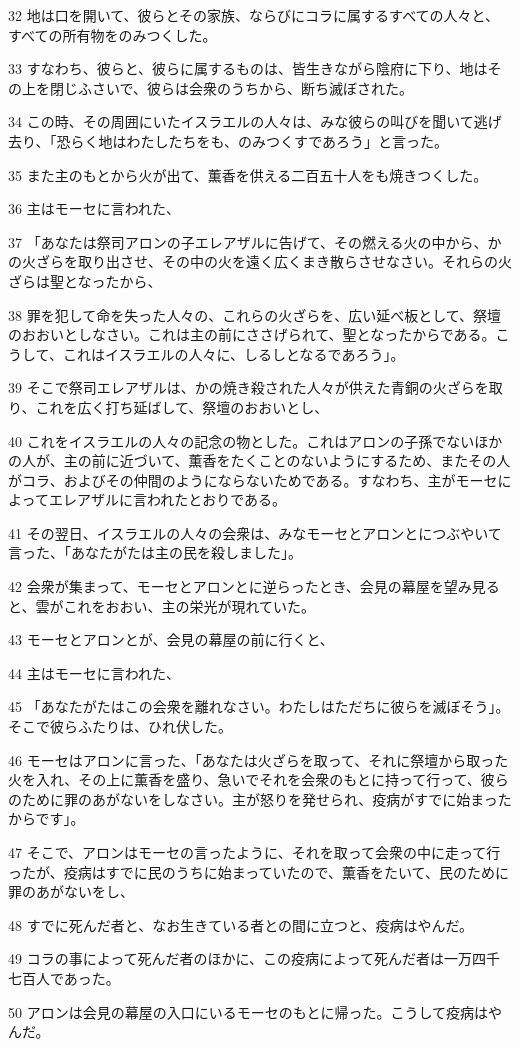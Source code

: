 \par 32 地は口を開いて、彼らとその家族、ならびにコラに属するすべての人々と、すべての所有物をのみつくした。
\par 33 すなわち、彼らと、彼らに属するものは、皆生きながら陰府に下り、地はその上を閉じふさいで、彼らは会衆のうちから、断ち滅ぼされた。
\par 34 この時、その周囲にいたイスラエルの人々は、みな彼らの叫びを聞いて逃げ去り、「恐らく地はわたしたちをも、のみつくすであろう」と言った。
\par 35 また主のもとから火が出て、薫香を供える二百五十人をも焼きつくした。
\par 36 主はモーセに言われた、
\par 37 「あなたは祭司アロンの子エレアザルに告げて、その燃える火の中から、かの火ざらを取り出させ、その中の火を遠く広くまき散らさせなさい。それらの火ざらは聖となったから、
\par 38 罪を犯して命を失った人々の、これらの火ざらを、広い延べ板として、祭壇のおおいとしなさい。これは主の前にささげられて、聖となったからである。こうして、これはイスラエルの人々に、しるしとなるであろう」。
\par 39 そこで祭司エレアザルは、かの焼き殺された人々が供えた青銅の火ざらを取り、これを広く打ち延ばして、祭壇のおおいとし、
\par 40 これをイスラエルの人々の記念の物とした。これはアロンの子孫でないほかの人が、主の前に近づいて、薫香をたくことのないようにするため、またその人がコラ、およびその仲間のようにならないためである。すなわち、主がモーセによってエレアザルに言われたとおりである。
\par 41 その翌日、イスラエルの人々の会衆は、みなモーセとアロンとにつぶやいて言った、「あなたがたは主の民を殺しました」。
\par 42 会衆が集まって、モーセとアロンとに逆らったとき、会見の幕屋を望み見ると、雲がこれをおおい、主の栄光が現れていた。
\par 43 モーセとアロンとが、会見の幕屋の前に行くと、
\par 44 主はモーセに言われた、
\par 45 「あなたがたはこの会衆を離れなさい。わたしはただちに彼らを滅ぼそう」。そこで彼らふたりは、ひれ伏した。
\par 46 モーセはアロンに言った、「あなたは火ざらを取って、それに祭壇から取った火を入れ、その上に薫香を盛り、急いでそれを会衆のもとに持って行って、彼らのために罪のあがないをしなさい。主が怒りを発せられ、疫病がすでに始まったからです」。
\par 47 そこで、アロンはモーセの言ったように、それを取って会衆の中に走って行ったが、疫病はすでに民のうちに始まっていたので、薫香をたいて、民のために罪のあがないをし、
\par 48 すでに死んだ者と、なお生きている者との間に立つと、疫病はやんだ。
\par 49 コラの事によって死んだ者のほかに、この疫病によって死んだ者は一万四千七百人であった。
\par 50 アロンは会見の幕屋の入口にいるモーセのもとに帰った。こうして疫病はやんだ。

